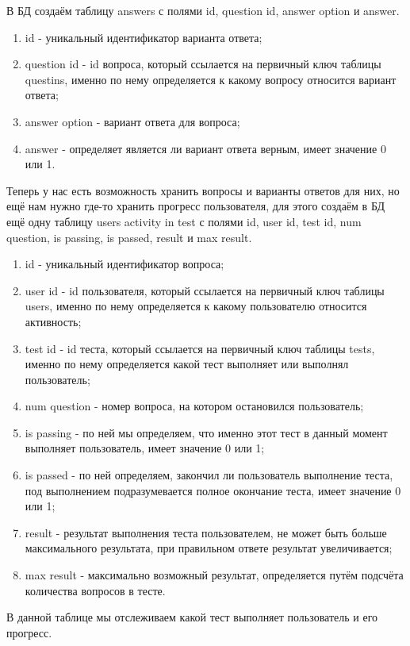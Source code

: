 \documentclass[12pt, oldlfont, amsfonts]{report}
\begin{document}
В БД создаём таблицу { answers} с полями { id}, { question id}, { answer option} и { answer}.
\begin{enumerate}
\item { id} - уникальный идентификатор варианта ответа;
\item { question id} - id вопроса, который ссылается на первичный ключ таблицы { questins}, именно по нему определяется к какому вопросу относится вариант ответа;
\item { answer option} - вариант ответа для вопроса;
\item {answer} - определяет является ли вариант ответа верным, имеет значение 0 или 1.
\end{enumerate}	
Теперь у нас есть возможность хранить вопросы и варианты ответов для них, но ещё нам нужно где-то хранить прогресс пользователя, для этого создаём в БД ещё одну таблицу { users activity in test} с полями { id}, { user id}, { test id}, { num question}, { is passing}, { is passed}, { result} и { max result}.
\begin{enumerate}
\item { id} - уникальный идентификатор вопроса;
\item { user id} - id пользователя, который ссылается на первичный ключ таблицы { users}, именно по нему определяется к какому пользователю относится активность;
\item { test id} - id теста, который ссылается на первичный ключ таблицы { tests}, именно по нему определяется какой тест выполняет или выполнял пользователь;
\item { num question} - номер вопроса, на котором остановился пользователь;
\item { is passing} - по ней мы определяем, что именно этот тест в данный момент выполняет пользователь, имеет значение 0 или 1;
\item { is passed} - по ней определяем, закончил ли пользователь выполнение теста, под выполнением подразумевается полное окончание теста, имеет значение 0 или 1;
\item { result} - результат выполнения теста пользователем, не может быть больше максимального результата, при правильном ответе результат увеличивается;
\item { max result} - максимально возможный результат, определяется путём подсчёта количества вопросов в тесте. 
\end{enumerate}	
В данной таблице мы отслеживаем какой { тест} выполняет пользователь и его { прогресс}. 
\end{document}
